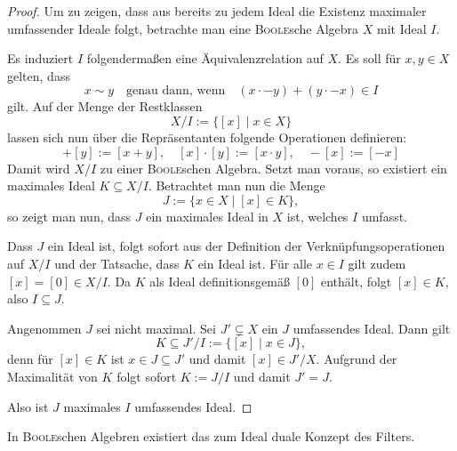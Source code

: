 \begin{proof}
  
  Um zu zeigen, dass aus \PIT bereits zu jedem Ideal die Existenz maximaler umfassender Ideale folgt, betrachte man eine \textsc{Boole}sche Algebra $X$ mit Ideal $I$.
  
  Es induziert $I$ folgendermaßen eine Äquivalenzrelation auf $X$.
  Es soll für $x,y \in X$ gelten, dass 
  \begin{displaymath}
    x \sim y \quad \text{genau dann, wenn} \quad (x \cdot -y) + (y \cdot -x) \in I
  \end{displaymath}
  gilt.
  Auf der Menge der Restklassen 
  \begin{displaymath}
    X / I := \{[x] \mid x \in X\}
  \end{displaymath}
  lassen sich nun über die Repräsentanten folgende Operationen definieren:
  \begin{displaymath}
    [x] + [y] := [x+y], \quad
    [x] \cdot [y] := [x \cdot y], \quad
    -[x] := [-x]
  \end{displaymath}
  Damit wird $X/I$ zu einer \textsc{Boole}schen Algebra.
  Setzt man \PIT voraus, so existiert ein maximales Ideal $K \subseteq X/I$.
  Betrachtet man nun die Menge
  \begin{displaymath}
    J := \{x \in X \mid [x] \in K\},
  \end{displaymath}
  so zeigt man nun, dass $J$ ein maximales Ideal in $X$ ist, welches $I$ umfasst.
  
  Dass $J$ ein Ideal ist, folgt sofort aus der Definition der Verknüpfungsoperationen auf $X/I$ und der Tatsache, dass $K$ ein Ideal ist.
  Für alle $x \in I$ gilt zudem $[x] = [0] \in X/I$. 
  Da $K$ als Ideal definitionsgemäß $[0]$ enthält, folgt $[x] \in K$, also $I \subseteq J$.
  
  Angenommen $J$ sei nicht maximal. Sei $J' \subsetneq X$ ein $J$ umfassendes Ideal.
  Dann gilt 
  \begin{displaymath}
    K \subseteq J'/I := \{[x] \mid x \in J\},
  \end{displaymath}
  denn für $[x] \in K$ ist $x \in J \subseteq J'$ und damit $[x] \in J'/X$.
  Aufgrund der Maximalität von $K$ folgt sofort $K := J/I$ und damit $J' = J$.

  Also ist $J$ maximales $I$ umfassendes Ideal.
\end{proof}

In \textsc{Boole}schen Algebren existiert das zum Ideal duale Konzept des Filters. 

